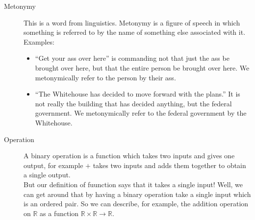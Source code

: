 \documentclass[12pt]{article}
\begin{document}
\begin{description}
  \item[Metonymy] This is a word from linguistics.  Metonymy is a
    figure of speech in which something is referred to by the name of
    something else associated with it.  Examples:
    \begin{itemize}
      \item ``Get your ass over here'' is commanding not that just the
        ass be brought over here, but that the entire person be
        brought over here. We metonymically refer to the person by
        their ass. 
      \item ``The Whitehouse has decided to move forward with the
        plans.''  It is not really the building that has decided
        anything, but the federal government.  We metonymically refer
        to the federal government by the Whitehouse. 
    \end{itemize}

  \item[Operation] A binary operation is a function which takes two
    inputs and gives one output, for example $+$ takes two inputs and
    adds them together to obtain a single output.  \\

    But our definition of fuunction says that it takes a single input!
    Well, we can get around that by having a binary operation take a
    single input which is an ordered pair.  So we can describe, for
    example, the addition operation on $\mathbb{R}$ as a function
    $\mathbb{R}\times\mathbb{R}\rightarrow\mathbb{R}$.
    

\end{description}
\end{document}
